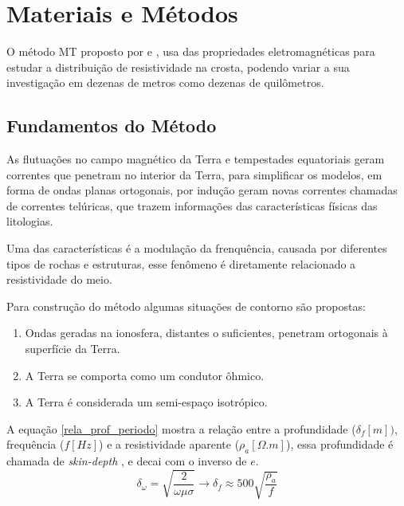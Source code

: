 \chapter{Materiais e Métodos}
    \label{cap-materiais}

    O método MT proposto por \citeauthor{tikhonov50} \citeyearpar{tikhonov50} e
    \citeauthor{cagniard53} \citeyearpar{cagniard53}, usa das propriedades
    eletromagnéticas para estudar a distribuição de resistividade na crosta, 
    podendo variar a sua investigação em dezenas de metros como dezenas de 
    quilômetros.

    \section{Fundamentos do Método}
	\label{embasamento_teorico}

	As flutuações no campo magnético da Terra e tempestades equatoriais
	geram correntes que penetram no interior da Terra, para 
	simplificar os modelos,	em forma de ondas planas ortogonais, por indução
	geram novas correntes chamadas de correntes 
	telúricas, que trazem informações das características físicas das 
	litologias.

	Uma das características é a modulação da frenquência, causada por
	diferentes tipos de rochas e estruturas, esse fenômeno é diretamente 
	relacionado a resistividade do meio.

	Para construção do método algumas situações de contorno são propostas:
	\begin{enumerate}
	    \item Ondas geradas na ionosfera, distantes o suficientes, penetram ortogonais à superfície
 		da Terra.
	    
	    \item A Terra se comporta como um condutor ôhmico.
	    \item A Terra é considerada um semi-espaço isotrópico.
	\end{enumerate}
	
	A equação \ref{rela_prof_periodo} mostra a relação entre a profundidade
	($\delta_f[m])$, frequência ($f[Hz]$) e a resistividade aparente ($\rho_a[\Omega.m]$), essa 
	profundidade é chamada de \textit{skin-depth} \cite{eletromag8hayt}, e decai com o inverso de $e$.
	\begin{equation}
	 \label{rela_prof_periodo}
	 \delta_\omega = \sqrt{\frac{2}{\omega \mu \sigma}} \longrightarrow \delta_f \approx 500  \sqrt{\frac{\rho_a}{f}}
	\end{equation}
	
